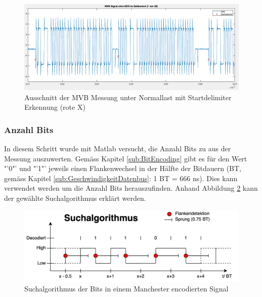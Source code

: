 \begin{figure}[H]
    \centering
    \includegraphics[width=0.8\linewidth]{Figures/Chap3/Busauslastung/Ausschnitt_MVB_mit_Delimiter.png}
    \caption{Ausschnitt der MVB Messung unter Normallast mit
Startdelimiter Erkennung (rote X)}
    \label{fig:enter-label}
\end{figure}


\subsubsection{Anzahl Bits}
\label{subsub:Nulldurchgänge}
In diesem Schritt wurde mit Matlab versucht, die Anzahl Bits zu aus der Messung auszuwerten. Gemäss Kapitel \ref{sub:BitEncoding} gibt es für den Wert "'0"' und "'1"' jeweils einen Flankenwechsel in der Hälfte der Bitdauern (BT, gemäss Kapitel \ref{sub:GeschwindigkeitDatenbus}: 1 BT = 666 ns). Dies kann verwendet werden um die Anzahl Bits herauszufinden. Anhand Abbildung \ref{fig:Suchalgo_Bits} kann der gewählte Suchalgorithmus erklärt werden.

\begin{figure}[H]
    \centering
    \includegraphics[width=0.9\linewidth]{Figures/Chap3/Busauslastung/Suchalgorithmus_Bits.png}
    \caption{Suchalgorithmus der Bits in einem Manchester encodierten Signal}
    \label{fig:Suchalgo_Bits}
\end{figure}

